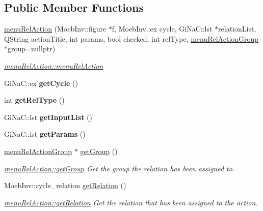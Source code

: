 \subsection*{Public Member Functions}
\begin{DoxyCompactItemize}
\item 
\mbox{\hyperlink{classmenu_rel_action_a2db14a6cd576e8cb645a0e1dcf584d4e}{menu\+Rel\+Action}} (Moeb\+Inv\+::figure $\ast$f, Moeb\+Inv\+::ex cycle, Gi\+Na\+C\+::lst $\ast$relation\+List, Q\+String action\+Title, int params, bool checked, int rel\+Type, \mbox{\hyperlink{classmenu_rel_action_group}{menu\+Rel\+Action\+Group}} $\ast$group=nullptr)
\begin{DoxyCompactList}\small\item\em \mbox{\hyperlink{classmenu_rel_action_a2db14a6cd576e8cb645a0e1dcf584d4e}{menu\+Rel\+Action\+::menu\+Rel\+Action}} \end{DoxyCompactList}\item 
\mbox{\label{classmenu_rel_action_acb80ac433c901f22dbddcff7445adf24}} 
Gi\+Na\+C\+::ex {\bfseries get\+Cycle} ()
\item 
\mbox{\label{classmenu_rel_action_a1092ced0a224fdb4c8f5a0b12548a120}} 
int {\bfseries get\+Rel\+Type} ()
\item 
\mbox{\label{classmenu_rel_action_a8ec0134231f519695901fa4d750fab4a}} 
Gi\+Na\+C\+::lst {\bfseries get\+Input\+List} ()
\item 
\mbox{\label{classmenu_rel_action_a8da5cc4f4063d4ea465d67b0aabc57e7}} 
Gi\+Na\+C\+::lst {\bfseries get\+Params} ()
\item 
\mbox{\hyperlink{classmenu_rel_action_group}{menu\+Rel\+Action\+Group}} $\ast$ \mbox{\hyperlink{classmenu_rel_action_aca0baeed9c6a266d677dae8dfb25d65b}{get\+Group}} ()
\begin{DoxyCompactList}\small\item\em \mbox{\hyperlink{classmenu_rel_action_aca0baeed9c6a266d677dae8dfb25d65b}{menu\+Rel\+Action\+::get\+Group}} Get the group the relation has been assigned to. \end{DoxyCompactList}\item 
Moeb\+Inv\+::cycle\+\_\+relation \mbox{\hyperlink{classmenu_rel_action_a34deae132c511b7e34af97585df9245c}{get\+Relation}} ()
\begin{DoxyCompactList}\small\item\em \mbox{\hyperlink{classmenu_rel_action_a34deae132c511b7e34af97585df9245c}{menu\+Rel\+Action\+::get\+Relation}} Get the relation that has been assigned to the action. \end{DoxyCompactList}\item 

\end{DoxyCompactItemize}
